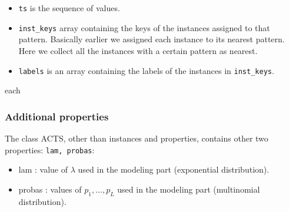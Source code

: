 \begin{itemize}
    \item \texttt{ts} is the sequence of values.
    \item \texttt{inst\_keys} array containing the keys of the instances assigned to that pattern.
    Basically earlier we assigned each instance to its nearest pattern. Here we collect all the
    instances with a certain pattern as nearest.
    \item \texttt{labels} is an array containing the labels of the instances in \texttt{inst\_keys}.
\end{itemize}each 

\subsubsection{Additional properties}
The class ACTS, other than instances and properties, contains other two properties: \texttt{lam, probas}:
\begin{itemize}
    \item lam : value of $\lambda$ used in the modeling part (exponential distribution).
    \item probas : values of $p_1, \dots, p_L$ used in the modeling part (multinomial distribution).
\end{itemize}



